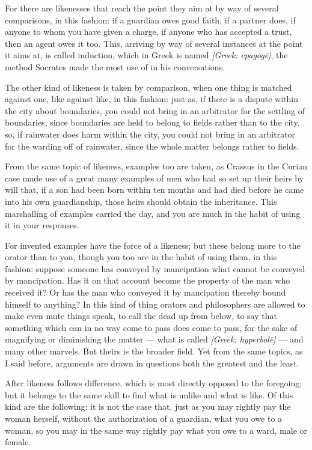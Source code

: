  For there are likenesses that reach the point they aim at by way of several comparisons, in this fashion: if a guardian owes good faith, if a partner does, if anyone to whom you have given a charge, if anyone who has accepted a trust, then an agent owes it too. This, arriving by way of several instances at the point it aims at, is called induction, which in Greek is named \textit{[Greek: epagōgē]}, the method Socrates made the most use of in his conversations.

 The other kind of likeness is taken by comparison, when one thing is matched against one, like against like, in this fashion: just as, if there is a dispute within the city about boundaries, you could not bring in an arbitrator for the settling of boundaries, since boundaries are held to belong to fields rather than to the city, so, if rainwater does harm within the city, you could not bring in an arbitrator for the warding off of rainwater, since the whole matter belongs rather to fields.

 From the same topic of likeness, examples too are taken, as Crassus in the Curian case made use of a great many examples of men who had so set up their heirs by will that, if a son had been born within ten months and had died before he came into his own guardianship, those heirs should obtain the inheritance. This marshalling of examples carried the day, and you are much in the habit of using it in your responses.

 For invented examples have the force of a likeness; but these belong more to the orator than to you, though you too are in the habit of using them, in this fashion: suppose someone has conveyed by mancipation what cannot be conveyed by mancipation. Has it on that account become the property of the man who received it? Or has the man who conveyed it by mancipation thereby bound himself to anything? In this kind of thing orators and philosophers are allowed to make even mute things speak, to call the dead up from below, to say that something which can in no way come to pass does come to pass, for the sake of magnifying or diminishing the matter — what is called \textit{[Greek: hyperbolē]} — and many other marvels. But theirs is the broader field. Yet from the same topics, as I said before, arguments are drawn in questions both the greatest and the least.

 After likeness follows difference, which is most directly opposed to the foregoing; but it belongs to the same skill to find what is unlike and what is like. Of this kind are the following: it is not the case that, just as you may rightly pay the woman herself, without the authorization of a guardian, what you owe to a woman, so you may in the same way rightly pay what you owe to a ward, male or female.

